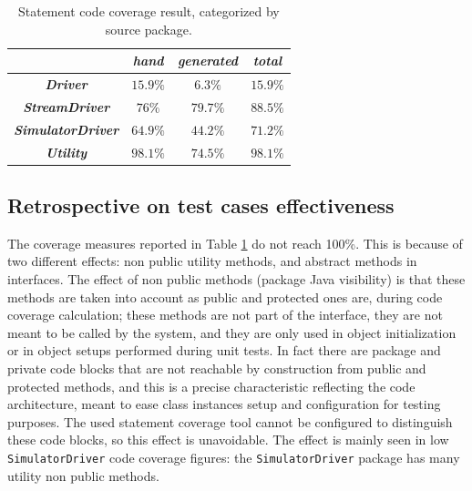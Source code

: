 \documentclass[english]{lni}
\newcommand{\lil}[1]{\texttt{\lstinline|#1|}}
\begin{document}
\begin{table}[htbp]
  \caption{Statement code coverage result, categorized by source package.}
  \label{tab:statement_code_coverage}
  \begin{center}
    \begin{tabular}{|c|c|c|c|}\hline
      & \textbf{\textit{hand}} & \textbf{\textit{generated}} &
      \textbf{\textit{total}} \\\hline
      \textbf{\textit{Driver}} & $15.9 \%$ & $6.3 \%$ & $15.9 \%$ \\\hline
      \textbf{\textit{StreamDriver}} & $76 \%$ & $79.7 \%$ & $88.5 \%$ \\\hline
      \textbf{\textit{SimulatorDriver}} & $64.9 \%$ & $44.2 \%$ &
      $71.2 \%$ \\\hline
      \textbf{\textit{Utility}} & $98.1 \%$ & $74.5 \%$ & $98.1 \%$ \\\hline
    \end{tabular}
  \end{center}
\end{table}



\subsection{Retrospective on test cases effectiveness}
\label{subsec:test_cases_retrospectives}

The coverage measures reported in Table \ref{tab:statement_code_coverage} do not reach 100\%. 
This is because of two different effects: non public utility methods, and abstract methods in interfaces.
The effect of non public methods (package Java visibility) is that these methods are taken into account as public and protected ones are, during code coverage calculation; these methods are not part of the interface, they are not meant to be called by the system, and they are only used in object initialization or in object setups performed during unit tests. 
In fact there are package and private code blocks that are not reachable by construction from public and protected methods, and this is a precise characteristic reflecting the code architecture, meant to ease class instances setup and configuration for testing purposes. 
The used statement coverage tool cannot be configured to distinguish these code blocks, so this effect is unavoidable. 
The effect is mainly seen in low \lil{SimulatorDriver} code coverage figures: the \lil{SimulatorDriver} package has many utility non public methods.
\end{document}
